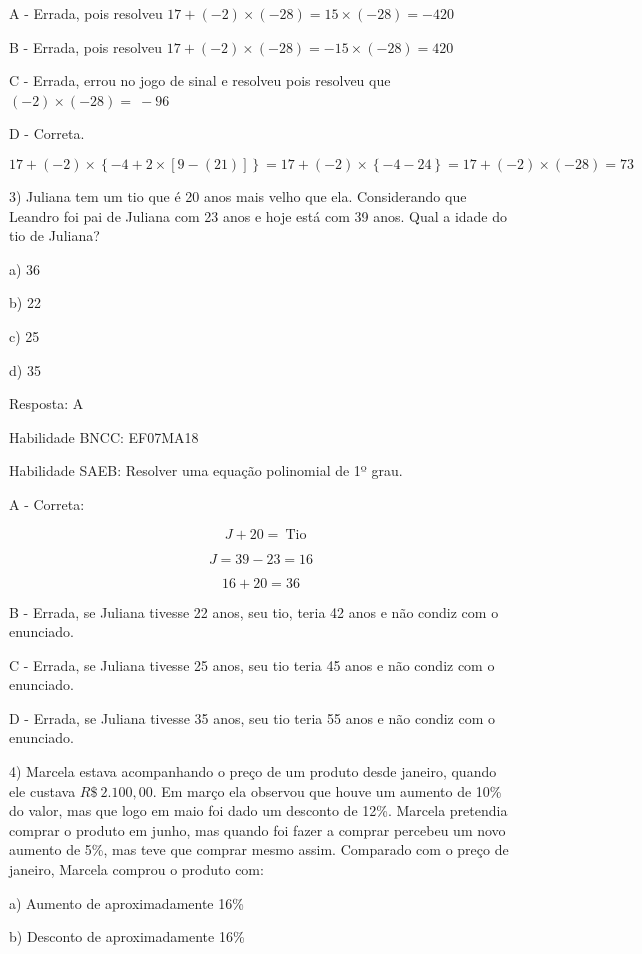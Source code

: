 A - Errada, pois resolveu
\(17 + ( - 2) \times \left( - 28 \right) = 15 \times ( - 28) = - 420\ \)

B - Errada, pois resolveu
\(17 + ( - 2) \times \left( - 28 \right) = - 15 \times ( - 28) = 420\ \)

C - Errada, errou no jogo de sinal e resolveu pois resolveu que
\(( - 2) \times \left( - 28 \right) = \  - 96\)

D - Correta.

\[17 + ( - 2) \times \left\{ - 4 + 2 \times \left\lbrack 9 - \left( 21 \right) \right\rbrack \right\} = 17 + ( - 2) \times \left\{ - 4 - 24 \right\} = 17 + ( - 2) \times \left( - 28 \right) = 73\]

3) Juliana tem um tio que é 20 anos mais velho que ela. Considerando que
Leandro foi pai de Juliana com 23 anos e hoje está com 39 anos. Qual a
idade do tio de Juliana?

a) 36

b) 22

c) 25

d) 35

Resposta: A

Habilidade BNCC: EF07MA18

Habilidade SAEB: Resolver uma equação polinomial de 1º grau.

A - Correta:

\[\text{\ \ \ \ \ \ \ }J + 20 = \ \text{Tio}\]

\[J = 39 - 23 = 16\]

\[16 + 20 = 36\]

B - Errada, se Juliana tivesse 22 anos, seu tio, teria 42 anos e não
condiz com o enunciado.

C - Errada, se Juliana tivesse 25 anos, seu tio teria 45 anos e não
condiz com o enunciado.

D - Errada, se Juliana tivesse 35 anos, seu tio teria 55 anos e não
condiz com o enunciado.

4) Marcela estava acompanhando o preço de um produto desde janeiro,
quando ele custava \(R\$\ 2.100,00\). Em março ela observou que houve um
aumento de 10\% do valor, mas que logo em maio foi dado um desconto de
12\%. Marcela pretendia comprar o produto em junho, mas quando foi fazer
a comprar percebeu um novo aumento de 5\%, mas teve que comprar mesmo
assim. Comparado com o preço de janeiro, Marcela comprou o produto com:

a) Aumento de aproximadamente 16\%

b) Desconto de aproximadamente 16\%

